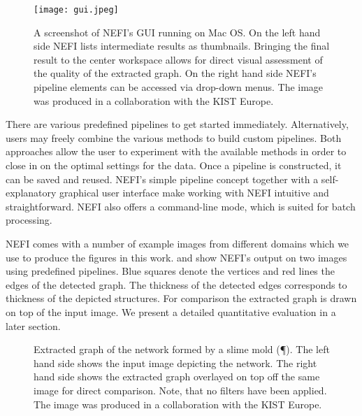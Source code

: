 	\begin{figure}
		\centering
		\texttt{[image: gui.jpeg]}
		\caption[NEFI's graphical user interface.]{A screenshot of NEFI's GUI running on Mac OS. On the left hand side NEFI lists intermediate results as thumbnails. Bringing the final result to the center workspace allows for direct visual assessment of the quality of the extracted graph. On the right hand side NEFI's pipeline elements can be accessed via drop-down menus. The image was produced in a collaboration with the KIST Europe.}
		\label{fig:nefi_gui}
	\end{figure}

	There are various predefined pipelines to get started immediately. Alternatively, users may freely combine the various methods to build custom pipelines. 
	Both approaches allow the user to experiment with the available methods in order to close in on the optimal settings for the data. Once a pipeline is constructed, it can be saved and reused. NEFI's simple pipeline concept together with a self-explanatory graphical user interface make working with NEFI intuitive and straightforward. NEFI also offers a command-line mode, which is suited for batch processing. 

	NEFI comes with a number of example images from different domains which we use to produce the figures in this work.  and  show NEFI's output on two images using predefined pipelines. Blue squares denote the vertices and red lines the edges of the detected graph. The thickness of the detected edges corresponds to thickness of the depicted structures. For comparison the extracted graph is drawn on top of the input image. We present a detailed quantitative evaluation in a later section.


	\begin{figure}
		\centering
		\caption[\P: Input and output of NEFI]{Extracted graph of the network formed by a slime mold (\P). The left hand side shows the input image depicting the network. The right hand side shows the extracted graph overlayed on top off the same image for direct comparison. Note, that no filters have been applied. The image was produced in a collaboration with the KIST Europe.}
		\label{fig:physarum}
	\end{figure}

